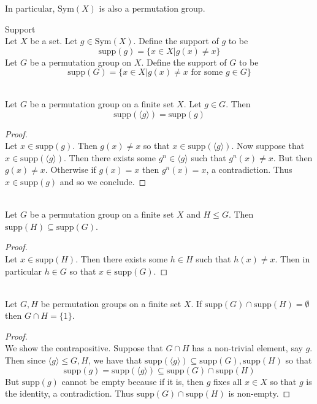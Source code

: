 \documentclass[a4paper]{article}
\begin{document}
In particular, $\text{Sym}(X)$ is also a permutation group. 

\begin{defn}{Support}{}\\
Let $X$ be a set. Let $g\in\text{Sym}(X)$. Define the support of $g$ to be $$\text{supp}(g)=\{x\in X|g(x)\neq x\}$$ Let $G$ be a permutation group on $X$. Define the support of $G$ to be $$\text{supp}(G)=\{x\in X|g(x)\neq x\text{ for some }g\in G\}$$
\end{defn}

\begin{lmm}{}{}\\
Let $G$ be a permutation group on a finite set $X$. Let $g\in G$. Then $$\text{supp}(\langle g\rangle)=\text{supp}(g)$$ 
\begin{proof}\\
Let $x\in\text{supp}(g)$. Then $g(x)\neq x$ so that $x\in\text{supp}(\langle g\rangle)$. Now suppose that $x\in\text{supp}(\langle g\rangle)$. Then there exists some $g^n\in\langle g\rangle$ such that $g^n(x)\neq x$. But then $g(x)\neq x$. Otherwise if $g(x)=x$ then $g^n(x)=x$, a contradiction. Thus $x\in\text{supp}(g)$ and so we conclude. 
\end{proof}
\end{lmm}

\begin{lmm}{}{}\\
Let $G$ be a permutation group on a finite set $X$ and $H\leq G$. Then $\text{supp}(H)\subseteq\text{supp}(G)$. 
\begin{proof}\\
Let $x\in\text{supp}(H)$. Then there exists some $h\in H$ such that $h(x)\neq x$. Then in particular $h\in G$ so that $x\in\text{supp}(G)$. 
\end{proof}
\end{lmm}

\begin{prp}{}{}\\
Let $G,H$ be permutation groups on a finite set $X$. If $\text{supp}(G)\cap\text{supp}(H)=\emptyset$ then $G\cap H=\{1\}$. 
\begin{proof}\\
We show the contrapositive. Suppose that $G\cap H$ has a non-trivial element, say $g$. Then since $\langle g\rangle\leq G,H$, we have that $\text{supp}(\langle g\rangle)\subseteq\text{supp}(G),\text{supp}(H)$ so that $$\text{supp}(g)=\text{supp}(\langle g\rangle)\subseteq\text{supp}(G)\cap\text{supp}(H)$$ But $\text{supp}(g)$ cannot be empty because if it is, then $g$ fixes all $x\in X$ so that $g$ is the identity, a contradiction. Thus $\text{supp}(G)\cap\text{supp}(H)$ is non-empty. 
\end{proof}
\end{prp}
\end{document}
